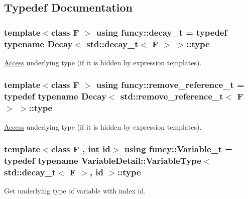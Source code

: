 \subsection{Typedef Documentation}
\hypertarget{namespacefuncy_ab4930ccd94b2ac4d9ee9069453f30c84}{
\subsubsection[{decay\-\_\-t}]{\setlength{\rightskip}{0pt plus 5cm}template$<$class F $>$ using {\bf funcy\-::decay\-\_\-t} = typedef typename {\bf Decay}$<$ std\-::decay\-\_\-t$<$ F $>$ $>$\-::type}}\label{namespacefuncy_ab4930ccd94b2ac4d9ee9069453f30c84}


\hyperlink{namespacefuncy_1_1Access}{Access} underlying type (if it is hidden by expression templates). 

\hypertarget{namespacefuncy_af445dd811bafa51449c6380536b005c0}{
\subsubsection[{remove\-\_\-reference\-\_\-t}]{\setlength{\rightskip}{0pt plus 5cm}template$<$class F $>$ using {\bf funcy\-::remove\-\_\-reference\-\_\-t} = typedef typename {\bf Decay}$<$ std\-::remove\-\_\-reference\-\_\-t$<$ F $>$ $>$\-::type}}\label{namespacefuncy_af445dd811bafa51449c6380536b005c0}


\hyperlink{namespacefuncy_1_1Access}{Access} underlying type (if it is hidden by expression templates). 

\hypertarget{namespacefuncy_abb94be57bfb973aa11e5be3f37f7f608}{
\subsubsection[{Variable\-\_\-t}]{\setlength{\rightskip}{0pt plus 5cm}template$<$class F , int id$>$ using {\bf funcy\-::\-Variable\-\_\-t} = typedef typename Variable\-Detail\-::\-Variable\-Type$<$ std\-::decay\-\_\-t$<$ F $>$, id $>$\-::type}}\label{namespacefuncy_abb94be57bfb973aa11e5be3f37f7f608}


Get underlying type of variable with index id. 

